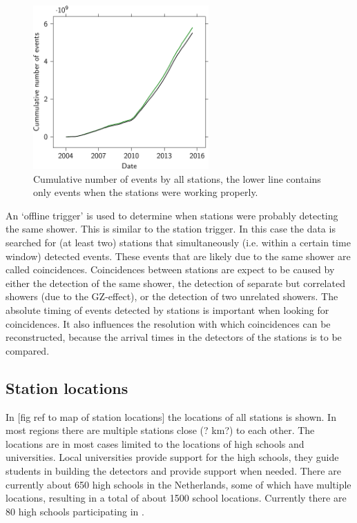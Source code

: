 \begin{figure}
    \centering
    \includegraphics[width=0.6\textwidth]
                    {plots/experiment/luminosity_network}
    \caption{Cumulative number of events by all stations, the lower line contains only events when the stations were working properly.}
    \label{fig:luminosity_network}
\end{figure}

An `offline trigger' is used to determine when stations were probably detecting the same shower. This is similar to the station trigger. In this case the data is searched for (at least two) stations that simultaneously (i.e. within a certain time window) detected events. These events that are likely due to the same shower are called coincidences. Coincidences between stations are expect to be caused by either the detection of the same shower, the detection of separate but correlated showers (due to the GZ-effect), or the detection of two unrelated showers. The absolute timing of events detected by stations is important when looking for coincidences. It also influences the resolution with which coincidences can be reconstructed, because the arrival times in the detectors of the stations is to be compared.

\subsection{Station locations}

In [fig ref to map of station locations] the locations of all \hisparc stations is shown. In most regions there are multiple stations close (? km?) to each other. The locations are in most cases limited to the locations of high schools and universities. Local universities provide support for the high schools, they guide students in building the detectors and provide support when needed. There are currently about \num{650} high schools in the Netherlands, some of which have multiple locations, resulting in a total of about \num{1500} school locations. Currently there are \num{80} high schools participating in \hisparc.

